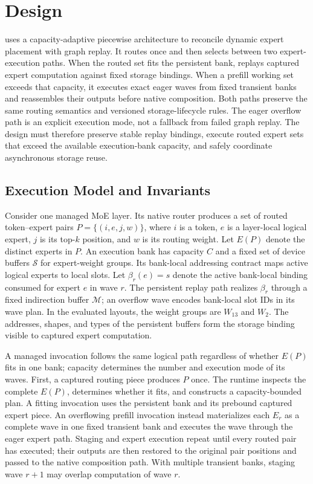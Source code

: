 \section{Design}
\label{sec:design}

\system uses a capacity-adaptive piecewise architecture to reconcile dynamic
expert placement with graph replay. It routes once and then selects between two
expert-execution paths. When the routed set fits the persistent bank, \system
replays captured expert computation against fixed storage bindings. When a
prefill working set exceeds that capacity, it executes exact eager waves from
fixed transient banks and reassembles their outputs before native composition.
Both paths preserve the same routing semantics and versioned storage-lifecycle
rules. The eager overflow path is an explicit execution mode, not a fallback
from failed graph replay. The design must therefore preserve stable replay
bindings, execute routed expert sets that exceed the available execution-bank
capacity, and safely coordinate asynchronous storage reuse.

\subsection{Execution Model and Invariants}
\label{sec:design-model}

Consider one managed MoE layer. Its native router produces a set of routed
token--expert pairs
$P=\{(i,e,j,w)\}$, where $i$ is a token, $e$ is a layer-local logical expert,
$j$ is its top-$k$ position, and $w$ is its routing weight. Let $E(P)$ denote
the distinct experts in $P$. An execution bank has capacity $C$ and a fixed
set of device buffers $\mathcal{S}$ for expert-weight groups. Its bank-local
addressing contract maps active logical experts to local slots. Let
$\beta_r(e)=s$ denote the active bank-local binding consumed for expert $e$ in
wave $r$. The persistent replay path realizes $\beta_r$ through a fixed
indirection buffer $\mathcal{M}$; an overflow wave encodes bank-local slot IDs
in its wave plan. In the evaluated layouts, the weight groups are $W_{13}$ and
$W_2$. The addresses, shapes, and types of the persistent buffers form the
storage binding visible to captured expert computation.

A managed invocation follows the same logical path regardless of whether
$E(P)$ fits in one bank; capacity determines the number and execution mode of
its waves. First, a captured routing piece produces $P$ once. The runtime
inspects the complete $E(P)$, determines whether it fits, and constructs a
capacity-bounded plan. A fitting invocation uses the persistent bank and its
prebound captured expert piece. An overflowing prefill invocation instead
materializes each $E_r$ as a complete wave in one fixed transient bank and
executes the wave through the eager expert path. Staging and expert execution
repeat until every routed pair has executed; their outputs are then restored
to the original pair positions and passed to the native composition path.
With multiple transient banks, staging wave $r+1$ may overlap computation of
wave $r$.

